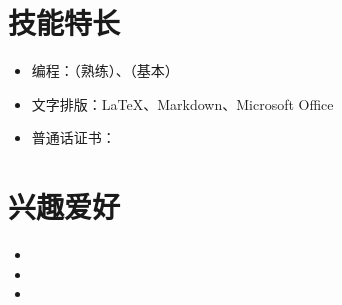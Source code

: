 \documentclass[11pt]{article}
\newlength{\iconwidth}
\begin{document}
    \begin{minipage}[t]{0.6\textwidth}
        \section[技能特长]{\makebox[\iconwidth][c]{\color{primary_color}{\faWrench}}\quad 技能特长}
        \begin{itemize}
        \setlength{\itemsep}{0.5em}
            \item 编程：（熟练）、（基本）
            \item 文字排版：\LaTeX、Markdown、Microsoft Office
            \item 普通话证书：
        \end{itemize}
    \end{minipage}
    \hfill
    \begin{minipage}[t]{0.35\textwidth}
        \section[兴趣爱好]{\makebox[\iconwidth][c]{\color{primary_color}{\faStar}}\quad 兴趣爱好}
        \begin{itemize}
        \setlength{\itemsep}{0.5em}
            \item 
            \item 
            \item 
        \end{itemize}
    \end{minipage}
    
     \newpage
\end{document}
